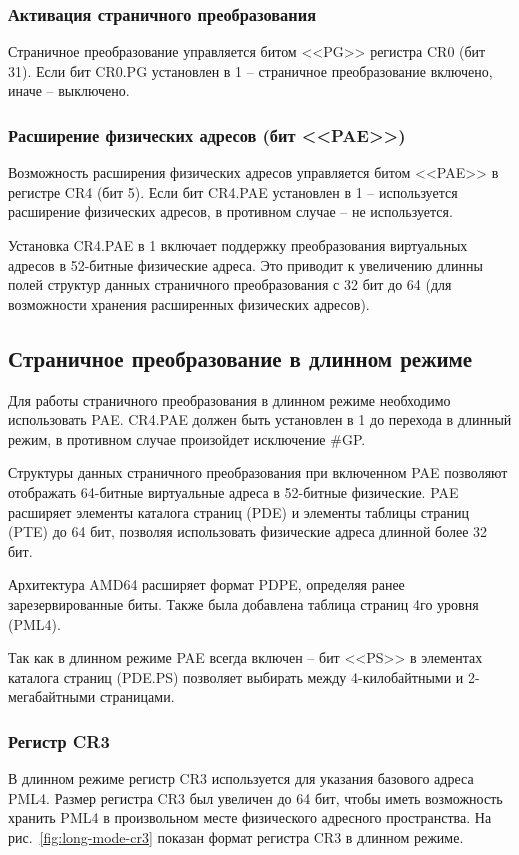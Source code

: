 \subsubsection*{Активация страничного преобразования}
Страничное преобразование управляется битом <<PG>> регистра CR0 (бит 31). Если бит CR0.PG установлен в 1 --
страничное преобразование включено, иначе -- выключено.

\subsubsection*{Расширение физических адресов (бит <<PAE>>)}
Возможность расширения физических адресов управляется битом <<PAE>> в регистре CR4 (бит 5). Если бит CR4.PAE
установлен в 1 -- используется расширение физических адресов, в противном случае -- не используется.

Установка CR4.PAE в 1 включает поддержку преобразования виртуальных адресов в 52-битные физические адреса.
Это приводит к увеличению длинны полей структур данных страничного преобразования с 32 бит до 64 (для
возможности хранения расширенных физических адресов).


\subsection{Страничное преобразование в длинном режиме}
Для работы страничного преобразования в длинном режиме необходимо использовать PAE.
CR4.PAE должен быть установлен в 1 до перехода в длинный режим, в противном случае
произойдет исключение \#GP.

Структуры данных страничного преобразования при включенном PAE позволяют отображать 64-битные
виртуальные адреса в 52-битные физические. PAE расширяет элементы каталога страниц (PDE) и
элементы таблицы страниц (PTE) до 64 бит, позволяя использовать физические адреса длинной более 32 бит.

Архитектура AMD64 расширяет формат PDPE, определяя ранее зарезервированные биты.
Также была добавлена таблица страниц 4го уровня (PML4).

Так как в длинном режиме PAE всегда включен -- бит <<PS>> в элементах каталога страниц (PDE.PS)
позволяет выбирать между 4-килобайтными и 2-мегабайтными страницами.

\subsubsection*{Регистр CR3}
В длинном режиме регистр CR3 используется для указания базового адреса PML4. Размер регистра CR3 был
увеличен до 64 бит, чтобы иметь возможность хранить PML4 в произвольном месте физического
адресного пространства. На рис.~\ref{fig:long-mode-cr3} показан формат регистра CR3 в длинном режиме.

